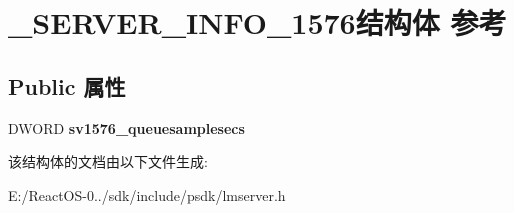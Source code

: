 \hypertarget{struct___s_e_r_v_e_r___i_n_f_o__1576}{}\section{\+\_\+\+S\+E\+R\+V\+E\+R\+\_\+\+I\+N\+F\+O\+\_\+1576结构体 参考}
\label{struct___s_e_r_v_e_r___i_n_f_o__1576}
\subsection*{Public 属性}
\begin{DoxyCompactItemize}
\item 
\mbox{\label{struct___s_e_r_v_e_r___i_n_f_o__1576_a73e81073dbd24dca2cff40aaca3728e4}} 
D\+W\+O\+RD {\bfseries sv1576\+\_\+queuesamplesecs}
\end{DoxyCompactItemize}


该结构体的文档由以下文件生成\+:\begin{DoxyCompactItemize}
\item 
E\+:/\+React\+O\+S-\/0../sdk/include/psdk/lmserver.\+h\end{DoxyCompactItemize}
